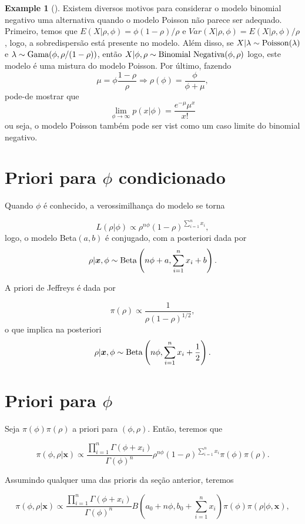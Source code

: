 \documentclass[
  letterpaper,
  DIV=11,
  numbers=noendperiod]{scrreprt}
\theoremstyle{definition}
\theoremstyle{plain}
\theoremstyle{definition}
\newtheorem{example}{Example}[chapter]
\theoremstyle{remark}
\begin{document}
\begin{example}[]
Existem diversos motivos para considerar o modelo binomial negativo uma
alternativa quando o modelo Poisson não parece ser adequado. Primeiro,
temos que \(E(X|\rho,\phi)=\phi(1-\rho)/\rho\) e
\(Var(X|\rho,\phi)=E(X|\rho,\phi)/\rho\), logo, a sobredispersão está
presente no modelo. Além disso, se
\(X|\lambda\sim\hbox{Poisson}(\lambda)\) e
\(\lambda\sim\hbox{Gama}(\phi, \rho/(1-\rho))\), então
\(X|\phi,\rho\sim\hbox{Binomial Negativa}(\phi,\rho)\) logo, este modelo
é uma mistura do modelo Poisson. Por último, fazendo
\[\mu=\phi\frac{1-\rho}{\rho}\Rightarrow \rho(\phi)=\frac{\phi}{\phi+\mu},\]
pode-de mostrar que
\[\lim_{\phi\rightarrow\infty}p(x|\phi)=\frac{e^{-\mu}\mu^x}{x!}\] ou
seja, o modelo Poisson também pode ser vist como um caso limite do
binomial negativo.

\section{\texorpdfstring{Priori para \(\phi\)
condicionado}{Priori para \textbackslash phi condicionado}}\label{priori-para-phi-condicionado}

Quando \(\phi\) é conhecido, a verossimilhança do modelo se torna

\[L(\rho|\phi)\propto \rho^{n\phi}(1-\rho)^{\sum_{i=1}^n x_i},\] logo, o
modelo Beta\((a,b)\) é conjugado, com a posteriori dada por
\[\rho|\boldsymbol{x},\phi\sim\hbox{Beta}\left(n\phi+a,\sum_{i=1}^n x_i+b\right).\]

A priori de Jeffreys é dada por

\[\pi(\rho)\propto \frac{1}{\rho(1-\rho)^{1/2}},\] o que implica na
posteriori
\[\rho|\boldsymbol{x},\phi\sim\hbox{Beta}\left(n\phi,\sum_{i=1}^n x_i+\frac{1}{2}\right).\]

\section{\texorpdfstring{Priori para
\(\phi\)}{Priori para \textbackslash phi}}\label{priori-para-phi}

Seja \(\pi(\phi)\pi(\rho)\) a priori para \((\phi,\rho)\). Então,
teremos que

\[\pi(\phi,\rho|\boldsymbol{x})\propto \frac{\prod_{i=1}^n\Gamma(\phi+x_i)}{\Gamma(\phi)^n}\rho^{n\phi}(1-\rho)^{\sum_{i=1}^n x_i}\pi(\phi)\pi(\rho).\]

Assumindo qualquer uma das prioris da seção anterior, teremos

\[\pi(\phi,\rho|\boldsymbol{x})\propto \frac{\prod_{i=1}^n\Gamma(\phi+x_i)}{\Gamma(\phi)^n}B\left(a_0+n\phi,b_0+\sum_{i=1}^nx_i\right)\pi(\phi)\pi(\rho|\phi,\boldsymbol{x}),\]


\end{example}
\end{document}
